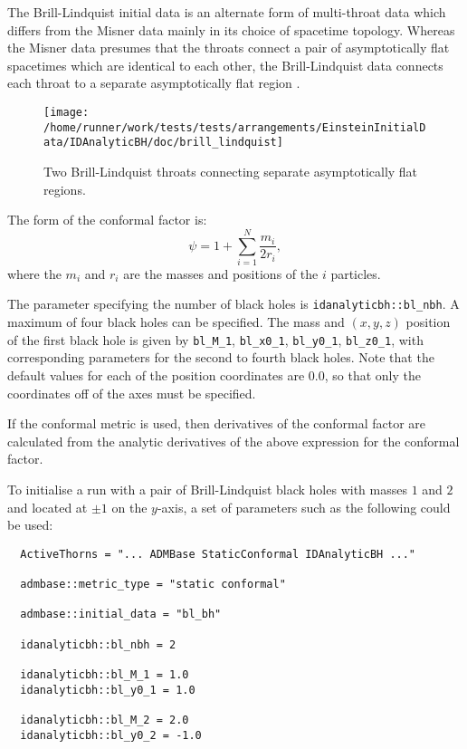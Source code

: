 \documentclass{article}
\begin{document}
The Brill-Lindquist initial data is an alternate form of multi-throat
data which differs from the Misner data mainly in its choice of
spacetime topology. Whereas the Misner data presumes that the throats
connect a pair of asymptotically flat spacetimes which are identical
to each other, the Brill-Lindquist data connects each throat to a
separate asymptotically flat region \cite{CactusEinstein_IDAnalyticBH_brill-lindquist:1963}.
\begin{figure}
  \centering
  \texttt{[image: /home/runner/work/tests/tests/arrangements/EinsteinInitialData/IDAnalyticBH/doc/brill\_lindquist]}
  \caption{Two Brill-Lindquist throats connecting separate
    asymptotically flat regions.}
\end{figure}
The form of the conformal factor is:
\begin{equation}
  \psi = 1 + \sum_{i=1}^N \frac{m_i}{2r_i},
\end{equation}
where the $m_i$ and $r_i$ are the masses and positions of the $i$
particles.

The parameter specifying the number of black holes is
\texttt{idanalyticbh::bl\_nbh}. A maximum of four black holes can be
specified. The mass and $(x,y,z)$ position of the first black hole is
given by \texttt{bl\_M\_1}, \texttt{bl\_x0\_1}, \texttt{bl\_y0\_1},
\texttt{bl\_z0\_1}, with corresponding parameters for the second to
fourth black holes. Note that the default values for each of the
position coordinates are $0.0$, so that only the coordinates off
of the axes must be specified.

If the conformal metric is used, then derivatives of the conformal
factor are calculated from the analytic derivatives of the above
expression for the conformal factor.

To initialise a run with a pair of Brill-Lindquist black holes with
masses $1$ and $2$ and located at $\pm 1$ on the $y$-axis, a set of
parameters such as the following could be used:
\begin{verbatim}
  ActiveThorns = "... ADMBase StaticConformal IDAnalyticBH ..."

  admbase::metric_type = "static conformal"

  admbase::initial_data = "bl_bh"

  idanalyticbh::bl_nbh = 2

  idanalyticbh::bl_M_1 = 1.0
  idanalyticbh::bl_y0_1 = 1.0

  idanalyticbh::bl_M_2 = 2.0
  idanalyticbh::bl_y0_2 = -1.0
\end{verbatim}
\end{document}
